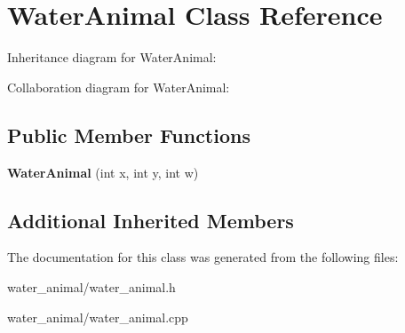 \hypertarget{classWaterAnimal}{}\section{Water\+Animal Class Reference}
\label{classWaterAnimal}


Inheritance diagram for Water\+Animal\+:


Collaboration diagram for Water\+Animal\+:
\subsection*{Public Member Functions}
\begin{DoxyCompactItemize}
\item 
{\bfseries Water\+Animal} (int x, int y, int w)\hypertarget{classWaterAnimal_a171e4fb79264bcd33370738d3424c217}{}\label{classWaterAnimal_a171e4fb79264bcd33370738d3424c217}

\end{DoxyCompactItemize}
\subsection*{Additional Inherited Members}


The documentation for this class was generated from the following files\+:\begin{DoxyCompactItemize}
\item 
water\+\_\+animal/water\+\_\+animal.\+h\item 
water\+\_\+animal/water\+\_\+animal.\+cpp\end{DoxyCompactItemize}
